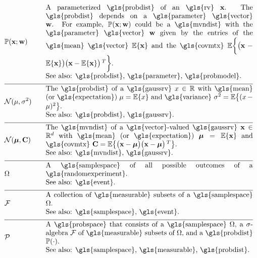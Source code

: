 \newpage
\begin{align} 
	&\prob{\featurevec;\weights} &\quad & \parbox{.85\textwidth}{A parameterized \gls{probdist} of an \gls{rv} $\featurevec$. 
		The \gls{probdist} depends on a \gls{parameter} \gls{vector} $\weights$. For example, $\prob{\featurevec;\weights}$ could be a 
		\gls{mvndist} with the \gls{parameter} \gls{vector} $\weights$ given by the entries of the \gls{mean} \gls{vector} $\expect \{ \featurevec \}$ 
		and the \gls{covmtx} $\expect \bigg \{ \big( \featurevec - \expect \{ \featurevec \}\big) \big( \featurevec - \expect \{ \featurevec \}\big)\,^{T}  \bigg\}$.
		\\ See also: \gls{probdist}, \gls{parameter}, \gls{probmodel}.} \nonumber \\[2mm] \hline \nonumber\\[-5mm]
	&\mathcal{N}(\mu, \sigma^{2}) &\quad & \parbox{.85\textwidth}{The \gls{probdist} of a 
		\gls{gaussrv} $\feature \in \mathbb{R}$ with \gls{mean} (or \gls{expectation}) $\mu= \expect \{ \feature \}$ 
		and \gls{variance} $\sigma^{2} =   \expect \big\{  (  \feature - \mu )^2 \big\}$.
		\\ See also: \gls{probdist}, \gls{gaussrv}.} \nonumber \\[2mm] \hline \nonumber\\[-5mm]
	&\mathcal{N}(\meanvecgeneric, \mathbf{C}) &\quad & \parbox{.85\textwidth}{The \gls{mvndist} of a \gls{vector}-valued 
		\gls{gaussrv} $\featurevec \in \mathbb{R}^{\featuredim}$ with \gls{mean} (or \gls{expectation}) $\clustermean= \expect \{ \featurevec \}$ 
		and \gls{covmtx} $\mathbf{C} =  \expect \big\{ \big( \featurevec - \clustermean \big)\big( \featurevec - \clustermean \big)\,^{T} \big\}$.
		\\ See also: \gls{mvndist}, \gls{gaussrv}.} \nonumber \\[2mm] \hline \nonumber\\[-5mm]  
	&\Omega &\quad & \parbox{.85\textwidth}{A \gls{samplespace} of all possible outcomes of a \gls{randomexperiment}. 
		\\ See also: \gls{event}.}  \nonumber \\[2mm] \hline \nonumber\\[-5mm]
	&\mathcal{F} &\quad & \parbox{.85\textwidth}{A collection of \gls{measurable} subsets of a \gls{samplespace} $\Omega$. 
		\\ See also: \gls{samplespace}, \gls{event}.}  \nonumber \\[2mm] \hline \nonumber\\[-5mm]
	&\mathcal{P} &\quad & \parbox{.85\textwidth}{A \gls{probspace} that consists of a \gls{samplespace} $\Omega$, a 
		$\sigma$-algebra $\mathcal{F}$ of \gls{measurable} subsets of $\Omega$, and a \gls{probdist} $\prob{ \cdot}$.
		\\ See also: \gls{samplespace}, \gls{measurable}, \gls{probdist}.} \nonumber                                       
\end{align}





